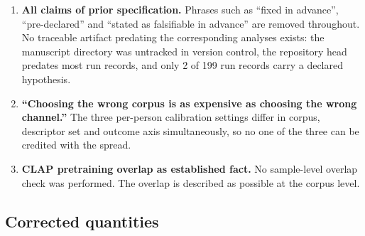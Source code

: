 \begin{enumerate}
\item \textbf{All claims of prior specification.} Phrases such as ``fixed in
advance'', ``pre-declared'' and ``stated as falsifiable in advance'' are
removed throughout. No traceable artifact predating the corresponding analyses
exists: the manuscript directory was untracked in version control, the
repository head predates most run records, and only 2 of 199 run records carry
a declared hypothesis.

\item \textbf{``Choosing the wrong corpus is as expensive as choosing the
wrong channel.''} The three per-person calibration settings differ in corpus,
descriptor set and outcome axis simultaneously, so no one of the three can be
credited with the spread.

\item \textbf{CLAP pretraining overlap as established fact.} No sample-level
overlap check was performed. The overlap is described as possible at the
corpus level.
\end{enumerate}

\subsection*{Corrected quantities}

